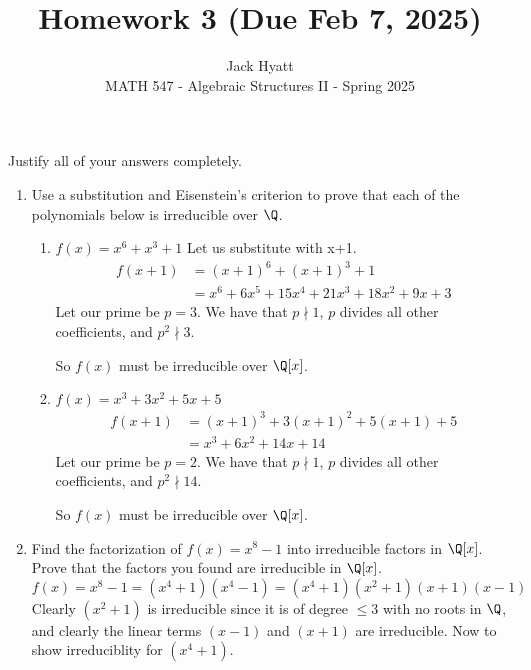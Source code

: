 \documentclass[12pt]{article}
\begin{document}
	
	
	
	\title{Homework 3 (Due Feb 7, 2025)}
	\author{Jack Hyatt\\ %
		MATH 547 - Algebraic Structures II - Spring 2025} 
	
	\maketitle
	
	Justify all of your answers completely.\\
	
	
	\medskip 
	
	\begin{enumerate}
		\item Use a substitution and Eisenstein's criterion to prove that each of the polynomials below is irreducible over $\Q$.
		\begin{enumerate}
			\item $f(x) = x^6 + x^3 + 1$\m
			Let us substitute with x+1.
			\begin{align*}
				f(x+1) &= (x+1)^6 + (x+1)^3 + 1\\
				&= x^6 + 6x^5 + 15x^4 + 21x^3 + 18x^2 + 9x + 3
			\end{align*}
			Let our prime be $p=3$. We have that $p \nmid 1$, $p$ divides all other coefficients, and $p^2 \nmid 3$.
			
			So $f(x)$ must be irreducible over $\Q[x]$.

			\item $f(x) = x^3 + 3x^2 + 5x + 5$\m
			\begin{align*}
				f(x+1) &= (x+1)^3 + 3(x+1)^2 + 5(x+1) + 5\\
				&= x^3 + 6x^2 + 14x + 14
			\end{align*}
			Let our prime be $p=2$. We have that $p \nmid 1$, $p$ divides all other coefficients, and $p^2 \nmid 14$.
			
			So $f(x)$ must be irreducible over $\Q[x]$.
		\end{enumerate}
	
		\item Find the factorization of $f(x) = x^8 - 1$ into irreducible factors in $\Q[x]$. Prove that the factors you found are irreducible in $\Q[x]$.\m
		\[f(x) = x^8-1 = (x^4+1)(x^4-1) = (x^4+1)(x^2+1)(x+1)(x-1)\]
		Clearly $(x^2+1)$ is irreducible since it is of degree $\leq 3$ with no roots in $\Q$, and clearly the linear terms $(x-1)$ and $(x+1)$ are irreducible. Now to show irreduciblity for $(x^4+1)$.
		

\end{enumerate}
\end{document}
